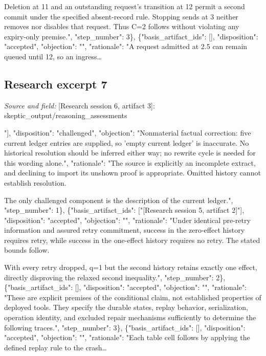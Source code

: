 \documentclass[11pt]{article}
\begin{document}
Deletion at 11 and an outstanding request's transition at 12 permit a second commit under the specified absent-record rule. Stopping sends at 3 neither removes nor disables that request. Thus C=2 follows without violating any expiry-only premise.", "step\_number": 3\}, \{"basis\_artifact\_ids": [], "disposition": "accepted", "objection": "", "rationale": "A request admitted at 2.5 can remain queued until 12, so an ingress\ldots{}

\subsection{Research excerpt 7}
\textit{Source and field: }[Research session 6, artifact 3]: skeptic\_output/reasoning\_assessments\par
[\{"basis\_artifact\_ids": ["[Research session 5, artifact 2]"], "disposition": "challenged", "objection": "Nonmaterial factual correction: five current ledger entries are supplied, so 'empty current ledger' is inaccurate. No historical resolution should be inferred either way; no rewrite cycle is needed for this wording alone.", "rationale": "The source is explicitly an incomplete extract, and declining to import its unshown proof is appropriate. Omitted history cannot establish resolution.

The only challenged component is the description of the current ledger.", "step\_number": 1\}, \{"basis\_artifact\_ids": ["[Research session 5, artifact 2]"], "disposition": "accepted", "objection": "", "rationale": "Under identical pre-retry information and assured retry commitment, success in the zero-effect history requires retry, while success in the one-effect history requires no retry. The stated bounds follow.

With every retry dropped, q=1 but the second history retains exactly one effect, directly disproving the relaxed second inequality.", "step\_number": 2\}, \{"basis\_artifact\_ids": [], "disposition": "accepted", "objection": "", "rationale": "These are explicit premises of the conditional claim, not established properties of deployed tools. They specify the durable states, replay behavior, serialization, operation identity, and excluded repair mechanisms sufficiently to determine the following traces.", "step\_number": 3\}, \{"basis\_artifact\_ids": [], "disposition": "accepted", "objection": "", "rationale": "Each table cell follows by applying the defined replay rule to the crash\ldots{}
\end{document}
